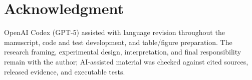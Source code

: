 \documentclass[journal]{IEEEtran}
\begin{document}
\section*{Acknowledgment}
OpenAI Codex (GPT-5) assisted with language revision throughout the manuscript, code and test development, and table/figure preparation. The research framing, experimental design, interpretation, and final responsibility remain with the author; AI-assisted material was checked against cited sources, released evidence, and executable tests.



\end{document}
